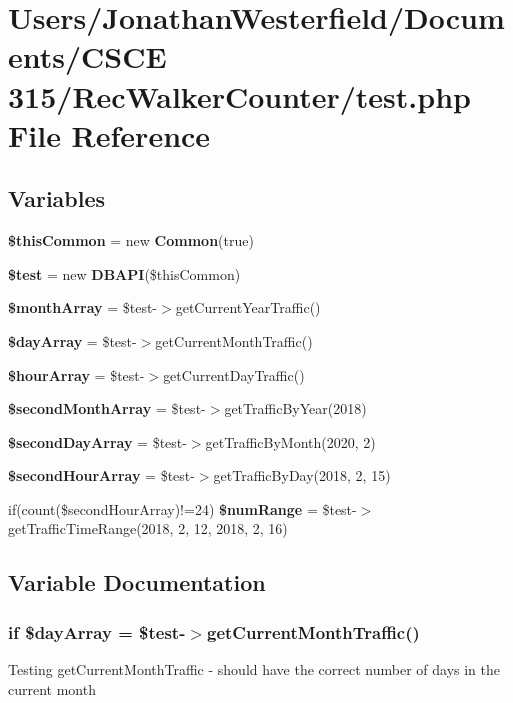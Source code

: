 \section{Users/\+Jonathan\+Westerfield/\+Documents/\+C\+S\+CE 315/\+Rec\+Walker\+Counter/test.php File Reference}
\label{test_8php}
\subsection*{Variables}
\begin{DoxyCompactItemize}
\item 
{\bf \$this\+Common} = new {\bf Common}(true)
\item 
{\bf \$test} = new {\bf D\+B\+A\+PI}(\$this\+Common)
\item 
{\bf \$month\+Array} = \$test-\/$>$get\+Current\+Year\+Traffic()
\item 
{\bf \$day\+Array} = \$test-\/$>$get\+Current\+Month\+Traffic()
\item 
{\bf \$hour\+Array} = \$test-\/$>$get\+Current\+Day\+Traffic()
\item 
{\bf \$second\+Month\+Array} = \$test-\/$>$get\+Traffic\+By\+Year(2018)
\item 
{\bf \$second\+Day\+Array} = \$test-\/$>$get\+Traffic\+By\+Month(2020, 2)
\item 
{\bf \$second\+Hour\+Array} = \$test-\/$>$get\+Traffic\+By\+Day(2018, 2, 15)
\item 
if(count(\$second\+Hour\+Array)!=24) {\bf \$num\+Range} = \$test-\/$>$get\+Traffic\+Time\+Range(2018, 2, 12, 2018, 2, 16)
\end{DoxyCompactItemize}


\subsection{Variable Documentation}
\subsubsection[{\$day\+Array}]{\setlength{\rightskip}{0pt plus 5cm}if \$day\+Array = \$test-\/$>$get\+Current\+Month\+Traffic()}\label{test_8php_a91cb99eedc303fe58894b37cdc8a05e2}
Testing get\+Current\+Month\+Traffic -\/ should have the correct number of days in the current month 

